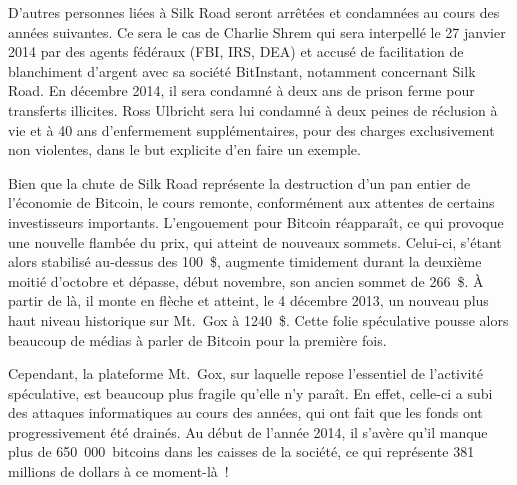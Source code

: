 D'autres personnes liées à Silk Road seront arrêtées et condamnées au cours des années suivantes. Ce sera le cas de Charlie Shrem qui sera interpellé le 27 janvier 2014 par des agents fédéraux (FBI, IRS, DEA) et accusé de facilitation de blanchiment d'argent avec sa société BitInstant, notamment concernant Silk Road. En décembre 2014, il sera condamné à deux ans de prison ferme pour transferts illicites. Ross Ulbricht sera lui condamné à deux peines de réclusion à vie et à 40 ans d'enfermement supplémentaires, pour des charges exclusivement non violentes, dans le but explicite d'en faire un exemple.

Bien que la chute de Silk Road représente la destruction d'un pan entier de l'économie de Bitcoin, le cours remonte, conformément aux attentes de certains investisseurs importants. L'engouement pour Bitcoin réapparaît, ce qui provoque une nouvelle flambée du prix, qui atteint de nouveaux sommets. Celui-ci, s'étant alors stabilisé au-dessus des 100~\$, augmente timidement durant la deuxième moitié d'octobre et dépasse, début novembre, son ancien sommet de 266~\$. À partir de là, il monte en flèche et atteint, le 4 décembre 2013, un nouveau plus haut niveau historique sur Mt.~Gox à 1240~\$. Cette folie spéculative pousse alors beaucoup de médias à parler de Bitcoin pour la première fois.

Cependant, la plateforme Mt.~Gox, sur laquelle repose l'essentiel de l'activité spéculative, est beaucoup plus fragile qu'elle n'y paraît. En effet, celle-ci a subi des attaques informatiques au cours des années, qui ont fait que les fonds ont progressivement été drainés. Au début de l'année 2014, il s'avère qu'il manque plus de 650~000~bitcoins dans les caisses de la société, ce qui représente 381 millions de dollars à ce moment-là~!

